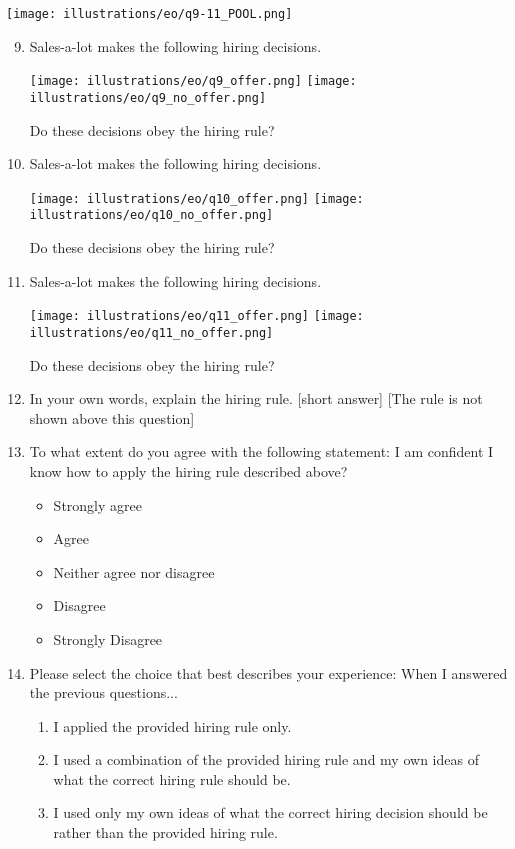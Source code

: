 \documentclass{article}
\newcommand{\correct}[1]{{\color{red}{#1}}}
\newcommand{\correct}[1]{{\color{red}{#1}}}
\begin{document}
\texttt{[image: illustrations/eo/q9-11\_POOL.png]}
\begin{enumerate}
\setcounter{enumi}{8}
    \item Sales-a-lot makes the following hiring decisions.

    \texttt{[image: illustrations/eo/q9\_offer.png]}
    \space\space\space
    \texttt{[image: illustrations/eo/q9\_no\_offer.png]}
    
    Do these decisions obey the hiring rule? \correct{Yes}

\item Sales-a-lot makes the following hiring decisions.

    \texttt{[image: illustrations/eo/q10\_offer.png]}
    \space\space\space
    \texttt{[image: illustrations/eo/q10\_no\_offer.png]}
    
    Do these decisions obey the hiring rule? \correct{No}
    
\item Sales-a-lot makes the following hiring decisions.

    \texttt{[image: illustrations/eo/q11\_offer.png]}
    \space\space\space
    \texttt{[image: illustrations/eo/q11\_no\_offer.png]}
    
    Do these decisions obey the hiring rule? \correct{No}

\item In your own words, explain the hiring rule. [short answer] [The rule is not shown above this question]

\item To what extent do you agree with the following statement: I am confident I know how to apply the hiring rule described above?
\begin{itemize}
    \item Strongly agree
    \item Agree
    \item Neither agree nor disagree
    \item Disagree
    \item Strongly Disagree
\end{itemize}

\item Please select the choice that best describes your experience: When I answered the previous questions...
\begin{enumerate}
    \item I applied the provided hiring rule only.
    \item I used a combination of the provided hiring rule and my own ideas of what the correct hiring rule should be.
    \item I used only my own ideas of what the correct hiring decision should be rather than the provided hiring rule.
\end{enumerate}


\end{enumerate}
\end{document}
